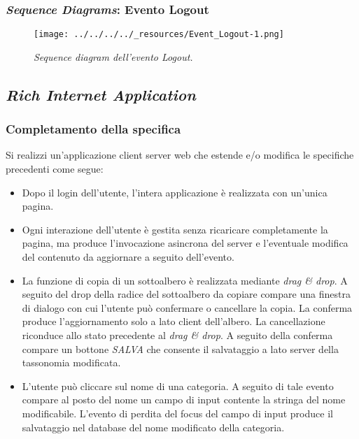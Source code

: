 \pagebreak

\hypertarget{sequence-diagrams-evento-logout}{%
\subsubsection{\texorpdfstring{\emph{Sequence Diagrams}: Evento
Logout}{Sequence Diagrams: Evento Logout}}\label{sequence-diagrams-evento-logout}}

\begin{figure}
\centering
\texttt{[image: ../../../../\_resources/Event\_Logout-1.png]}
\caption{\emph{Sequence diagram dell'evento Logout.}}
\end{figure}

\pagebreak

\hypertarget{rich-internet-application}{%
\subsection{\texorpdfstring{\emph{Rich Internet
Application}}{Rich Internet Application}}\label{rich-internet-application}}

\hypertarget{completamento-della-specifica}{%
\subsubsection{Completamento della
specifica}\label{completamento-della-specifica}}

Si realizzi un'applicazione client server web che estende e/o modifica
le specifiche precedenti come segue:

\begin{itemize}
\tightlist
\item
  Dopo il login dell'utente, l'intera applicazione è realizzata con
  un'unica pagina.
\item
  Ogni interazione dell'utente è gestita senza ricaricare completamente
  la pagina, ma produce l'invocazione asincrona del server e l'eventuale
  modifica del contenuto da aggiornare a seguito dell'evento.
\item
  La funzione di copia di un sottoalbero è realizzata mediante
  \emph{drag \& drop}. A seguito del drop della radice del sottoalbero
  da copiare compare una finestra di dialogo con cui l'utente può
  confermare o cancellare la copia. La conferma produce l'aggiornamento
  solo a lato client dell'albero. La cancellazione riconduce allo stato
  precedente al \emph{drag \& drop}. A seguito della conferma compare un
  bottone \emph{SALVA} che consente il salvataggio a lato server della
  tassonomia modificata.
\item
  L'utente può cliccare sul nome di una categoria. A seguito di tale
  evento compare al posto del nome un campo di input contente la stringa
  del nome modificabile. L'evento di perdita del focus del campo di
  input produce il salvataggio nel database del nome modificato della
  categoria.
\end{itemize}

